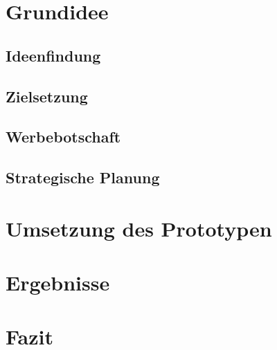 







\tableofcontents


\clearpage
\section{Grundidee}
\subsection{Ideenfindung}
\subsection{Zielsetzung}
\subsection{Werbebotschaft}
\subsection{Strategische Planung}


\clearpage
\section{Umsetzung des Prototypen}




%





\clearpage
\section{Ergebnisse}


\clearpage

\clearpage

\clearpage
\section{Fazit}




